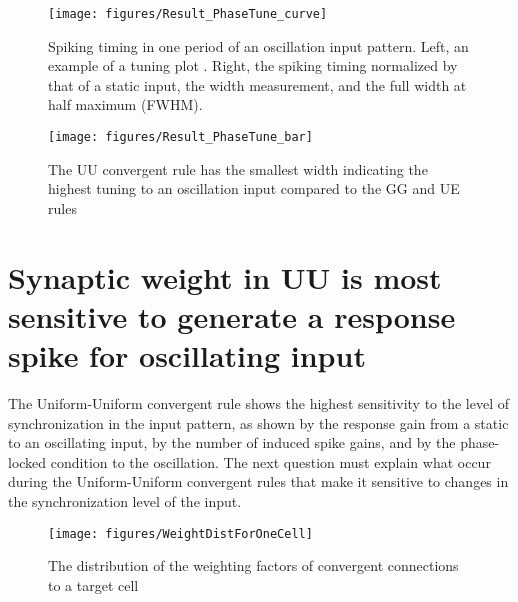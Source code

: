 \begin{figure}[!h]
	\centering
	\texttt{[image: figures/Result\_PhaseTune\_curve]}
	\caption[Spiking timing in one period of an oscillation input pattern]{Spiking timing in one period of an oscillation input pattern. Left, an example of a tuning plot . Right, the spiking timing normalized by that of a static input, the width measurement, and the full width at half maximum (FWHM).} 			
	\label{fig:PhaseCurve}
\end{figure}

\begin{figure}[!h]
	\centering
	\texttt{[image: figures/Result\_PhaseTune\_bar]}
	\caption[Comparison of Phase Tuning]{The UU convergent rule has the smallest width indicating the highest tuning to an oscillation input compared to the GG and UE rules} 
	\label{fig:PhaseBar}
\end{figure}

\section[Distribution of Synaptic Weight]{Synaptic weight in UU is most sensitive to generate a response spike for oscillating input}
 The Uniform-Uniform convergent rule shows the highest sensitivity to the level of synchronization in the input pattern, as shown by the response gain from a static to an oscillating input, by the number of induced spike gains, and by the phase-locked condition to the oscillation. The next question must explain what occur during the Uniform-Uniform convergent rules that make it sensitive to changes in the synchronization level of the input.

\begin{figure}[!h]
	\centering
	\texttt{[image: figures/WeightDistForOneCell]}
	\caption[The distribution of the weighting factors in single cell]{The distribution of the weighting factors of convergent connections to a target cell} 
	\label{fig:WdistOne}
\end{figure}

